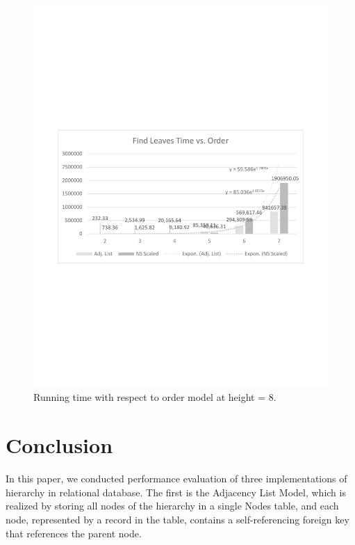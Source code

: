 \begin{figure}
\begin{center}
\includegraphics[width=6in]{images/eval/leaves/order/col_trend.pdf}
\caption{Running time with respect to order model at height = 8.\label{fig-leaves-order2}}
\end{center}
\end{figure}

\section{Conclusion}\label{sec_conclusion}

In this paper, we conducted performance evaluation of three implementations of hierarchy in relational database. The first is the Adjacency List Model, which is realized by storing all nodes of the hierarchy in a single Nodes table, and each node, represented by a record in the table, contains a self-referencing foreign key that references the parent node.

